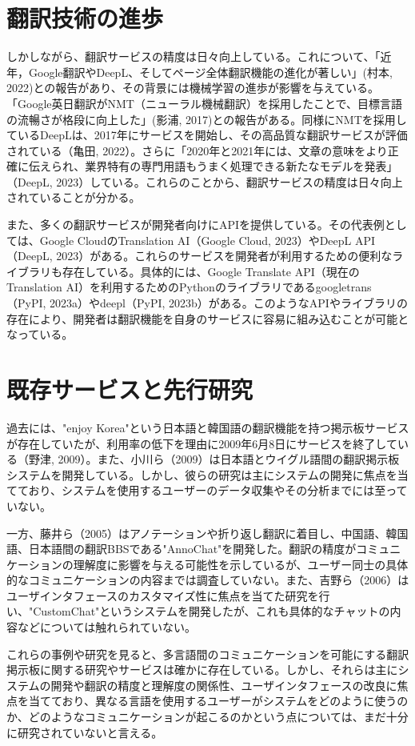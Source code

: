 \documentclass[b5paper,12pt]{jsreport}
\begin{document}
\section{翻訳技術の進歩}

しかしながら、翻訳サービスの精度は日々向上している。これについて、「近年，Google翻訳やDeepL、そしてページ全体翻訳機能の進化が著しい」(村本, 2022)との報告があり、その背景には機械学習の進歩が影響を与えている。「Google英日翻訳がNMT（ニューラル機械翻訳）を採用したことで、目標言語の流暢さが格段に向上した」(影浦, 2017)との報告がある。同様にNMTを採用しているDeepLは、2017年にサービスを開始し、その高品質な翻訳サービスが評価されている（亀田, 2022）。さらに「2020年と2021年には、文章の意味をより正確に伝えられ、業界特有の専門用語もうまく処理できる新たなモデルを発表」（DeepL, 2023）している。これらのことから、翻訳サービスの精度は日々向上されていることが分かる。

また、多くの翻訳サービスが開発者向けにAPIを提供している。その代表例としては、Google CloudのTranslation AI（Google Cloud, 2023）やDeepL API（DeepL, 2023）がある。これらのサービスを開発者が利用するための便利なライブラリも存在している。具体的には、Google Translate API（現在のTranslation AI）を利用するためのPythonのライブラリであるgoogletrans（PyPI, 2023a）やdeepl（PyPI, 2023b）がある。このようなAPIやライブラリの存在により、開発者は翻訳機能を自身のサービスに容易に組み込むことが可能となっている。

\section{既存サービスと先行研究}

過去には、"enjoy Korea"という日本語と韓国語の翻訳機能を持つ掲示板サービスが存在していたが、利用率の低下を理由に2009年6月8日にサービスを終了している（野津, 2009）。また、小川ら（2009）は日本語とウイグル語間の翻訳掲示板システムを開発している。しかし、彼らの研究は主にシステムの開発に焦点を当てており、システムを使用するユーザーのデータ収集やその分析までには至っていない。

一方、藤井ら（2005）はアノテーションや折り返し翻訳に着目し、中国語、韓国語、日本語間の翻訳BBSである"AnnoChat"を開発した。翻訳の精度がコミュニケーションの理解度に影響を与える可能性を示しているが、ユーザー同士の具体的なコミュニケーションの内容までは調査していない。また、吉野ら（2006）はユーザインタフェースのカスタマイズ性に焦点を当てた研究を行い、"CustomChat"というシステムを開発したが、これも具体的なチャットの内容などについては触れられていない。

これらの事例や研究を見ると、多言語間のコミュニケーションを可能にする翻訳掲示板に関する研究やサービスは確かに存在している。しかし、それらは主にシステムの開発や翻訳の精度と理解度の関係性、ユーザインタフェースの改良に焦点を当てており、異なる言語を使用するユーザーがシステムをどのように使うのか、どのようなコミュニケーションが起こるのかという点については、まだ十分に研究されていないと言える。
\end{document}
